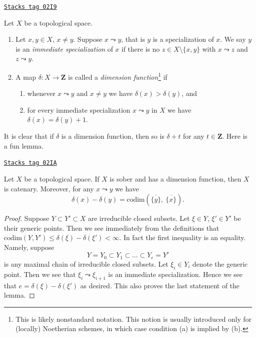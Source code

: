 \begin{definition}
\label{topology-definition-dimension-function}
\href{https://stacks.math.columbia.edu/tag/02I9}{\texttt{Stacks tag 02I9}}

Let $X$ be a topological space.
\begin{enumerate}
\item  Let $x, y \in X$, $x \not = y$. Suppose $x \leadsto y$, that
is $y$ is a specialization of $x$.
We say $y$ is an {\it immediate specialization}
of $x$ if there is no
$z \in X \setminus \{x, y\}$ with $x \leadsto z$ and $z \leadsto y$.
\item A map $\delta : X \to \mathbf{Z}$ is called a
{\it dimension function}\footnote{This is likely nonstandard
notation. This notion is usually introduced only for (locally) Noetherian
schemes, in which case condition (a) is implied by (b).} if
\begin{enumerate}
\item whenever $x \leadsto y$ and $x \not = y$
we have $\delta(x) > \delta(y)$, and
\item for every immediate specialization $x \leadsto y$ in $X$
we have $\delta(x) = \delta(y) + 1$.
\end{enumerate}
\end{enumerate}
\end{definition}

It is clear that if $\delta$ is a dimension function, then so is
$\delta + t$ for any $t \in \mathbf{Z}$. Here is a fun lemma.

\begin{lemma}
\label{topology-lemma-dimension-function-catenary}
\href{https://stacks.math.columbia.edu/tag/02IA}{\texttt{Stacks tag 02IA}}

Let $X$ be a topological space. If $X$ is sober and has a dimension
function, then $X$ is catenary. Moreover, for any $x \leadsto y$
we have
$$
\delta(x) - \delta(y) =
\text{codim}\left(\overline{\{y\}}, \ \overline{\{x\}}\right).
$$
\end{lemma}

\begin{proof}
Suppose $Y \subset Y' \subset X$ are irreducible closed subsets.
Let $\xi \in Y$, $\xi' \in Y'$ be their generic points.
Then we see immediately from the definitions that
$\text{codim}(Y, Y') \leq \delta(\xi) - \delta(\xi') < \infty$.
In fact the first inequality is an equality. Namely, suppose
$$
Y = Y_0 \subset Y_1 \subset \ldots \subset Y_e = Y'
$$
is any maximal chain of irreducible closed subsets. Let
$\xi_i \in Y_i$ denote the generic point. Then we see that
$\xi_i \leadsto \xi_{i + 1}$ is an immediate specialization.
Hence we see that $e = \delta(\xi) - \delta(\xi')$ as desired.
This also proves the last statement of the lemma.
\end{proof}

